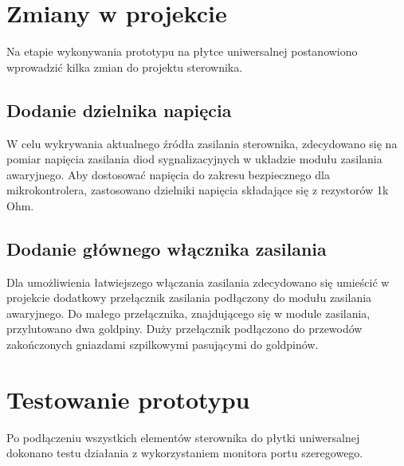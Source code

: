 \documentclass[11pt]{report}
\begin{document}
 \section{Zmiany w projekcie}
 Na etapie wykonywania prototypu na płytce uniwersalnej postanowiono wprowadzić kilka zmian do projektu sterownika.
 \subsection{Dodanie dzielnika napięcia}
 W celu wykrywania aktualnego źródła zasilania sterownika, zdecydowano się na pomiar napięcia zasilania diod sygnalizacyjnych w układzie modułu zasilania awaryjnego. Aby dostosować napięcia do zakresu bezpiecznego dla mikrokontrolera, zastosowano dzielniki napięcia składające się z rezystorów 1k Ohm.
 \subsection{Dodanie głównego włącznika zasilania}
 Dla umożliwienia łatwiejszego włączania zasilania zdecydowano się umieścić w projekcie dodatkowy przełącznik zasilania podłączony do modułu zasilania awaryjnego. Do małego przełącznika, znajdującego się w module zasilania, przylutowano dwa goldpiny. Duży przełącznik podłączono do przewodów zakończonych gniazdami szpilkowymi pasującymi do goldpinów.

 \section{Testowanie prototypu}
 Po podłączeniu wszystkich elementów sterownika do płytki uniwersalnej dokonano testu działania z wykorzystaniem monitora portu szeregowego.
 
\end{document}

